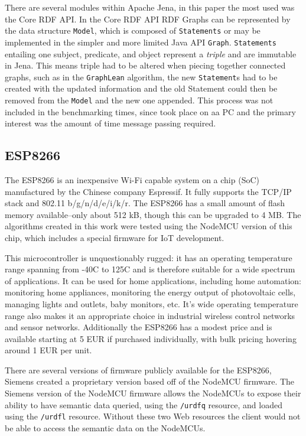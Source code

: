 There are several modules within Apache Jena, in this paper the most  used was the Core RDF API. In the Core RDF API RDF Graphs can be represented by the data structure \texttt{Model}, which is composed of \texttt{Statements} or may be implemented in the simpler and more limited Java API \texttt{Graph}. \texttt{Statements} entailing one subject, predicate, and object represent a \textit{triple} and are immutable in Jena. This means triple had to be altered when piecing together connected graphs, such as in the \texttt{GraphLean} algorithm, the new \texttt{Statement}s had to be created with the updated information and the old Statement could then be removed from the \texttt{Model} and the new one appended. This process was not included in the benchmarking times, since took place on aa PC and the primary interest was the amount of time message passing required. \cite{Jena.24.10.2017}

\subsection{ESP8266}

The ESP8266 is an inexpensive Wi-Fi capable system on a chip (SoC) manufactured by the Chinese company Espressif. It fully supports the TCP/IP stack and 802.11 b/g/n/d/e/i/k/r. The ESP8266 has a small amount of flash memory available--only about 512 kB, though this can be upgraded to 4 MB. The algorithms created in this work were tested using the NodeMCU version of this chip, which includes a special firmware for IoT development. \cite{Zeroday.2017}


This microcontroller is unquestionably rugged: it has an operating temperature range spanning from -40\textdegree{}C to 125\textdegree{}C and is therefore suitable for a wide spectrum of applications. It can be used for home applications, including home automation: monitoring home appliances, monitoring the energy output of photovoltaic cells, managing lights and outlets, baby monitors, etc. It's wide operating temperature range also makes it an appropriate choice in industrial wireless control networks and sensor networks. \cite{espDatasheet} Additionally the ESP8266 has a modest price and is available starting at 5 EUR if purchased individually, with bulk pricing hovering around 1 EUR per unit.

There are several versions of firmware publicly available for the ESP8266, Siemens created a proprietary version based off of the NodeMCU firmware. The Siemens version of the NodeMCU firmware allows the NodeMCUs to expose their ability to have semantic data queried, using the \texttt{/urdfq} resource, and loaded using the  \texttt{/urdfl} resource. Without these two Web resources the client would not be able to access the semantic data on the NodeMCUs. 

